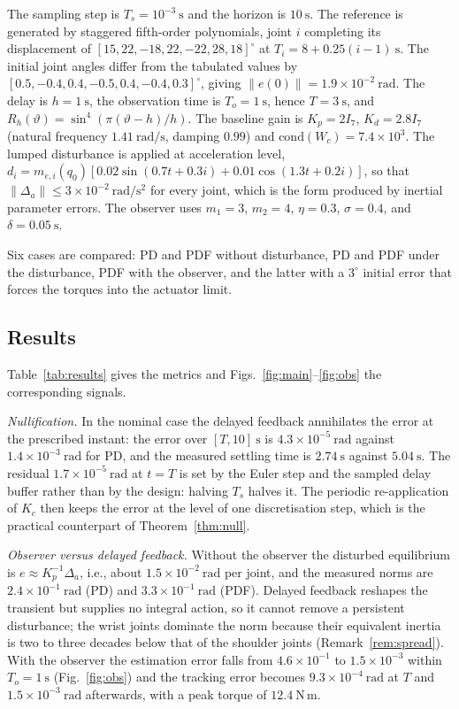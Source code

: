 The sampling step is $T_s=10^{-3}~\mathrm{s}$ and the horizon is $10~\mathrm{s}$.
The reference is generated by staggered fifth-order polynomials, joint $i$
completing its displacement of $[15,22,-18,22,-22,28,18]^\circ$ at
$T_i=8+0.25(i-1)~\mathrm{s}$. The initial joint angles differ from the tabulated
values by $[0.5,-0.4,0.4,-0.5,0.4,-0.4,0.3]^\circ$, giving
$\|e(0)\|=1.9\times10^{-2}~\mathrm{rad}$. The delay is $h=1~\mathrm{s}$, the
observation time is $T_o=1~\mathrm{s}$, hence $T=3~\mathrm{s}$, and
$R_h(\vartheta)=\sin^4(\pi(\vartheta-h)/h)$. The baseline gain is
$K_p=2I_7$, $K_d=2.8I_7$ (natural frequency $1.41~\mathrm{rad/s}$, damping
$0.99$) and $\mathrm{cond}(W_c)=7.4\times10^3$. The lumped disturbance is
applied at acceleration level,
$d_i=m_{e,i}(q_0)[0.02\sin(0.7t+0.3i)+0.01\cos(1.3t+0.2i)]$, so that
$\|\Delta_a\|\le3\times10^{-2}~\mathrm{rad/s^2}$ for every joint, which is the
form produced by inertial parameter errors. The observer uses $m_1=3$, $m_2=4$,
$\eta=0.3$, $\sigma=0.4$, and $\delta=0.05~\mathrm{s}$.

Six cases are compared: PD and PDF without disturbance, PD and PDF under the
disturbance, PDF with the observer, and the latter with a $3^\circ$ initial
error that forces the torques into the actuator limit.

\subsection{Results}
Table~\ref{tab:results} gives the metrics and Figs.~\ref{fig:main}--\ref{fig:obs}
the corresponding signals.

\emph{Nullification.} In the nominal case the delayed feedback annihilates the
error at the prescribed instant: the error over $[T,10]~\mathrm{s}$ is
$4.3\times10^{-5}~\mathrm{rad}$ against $1.4\times10^{-3}~\mathrm{rad}$ for PD,
and the measured settling time is $2.74~\mathrm{s}$ against $5.04~\mathrm{s}$.
The residual $1.7\times10^{-5}~\mathrm{rad}$ at $t=T$ is set by the Euler step
and the sampled delay buffer rather than by the design: halving $T_s$ halves
it. The periodic re-application of $K_c$ then keeps the error at the level of
one discretisation step, which is the practical counterpart of
Theorem~\ref{thm:null}.

\emph{Observer versus delayed feedback.} Without the observer the disturbed
equilibrium is $e\approx K_p^{-1}\Delta_a$, i.e., about
$1.5\times10^{-2}~\mathrm{rad}$ per joint, and the measured norms are
$2.4\times10^{-1}~\mathrm{rad}$ (PD) and $3.3\times10^{-1}~\mathrm{rad}$ (PDF).
Delayed feedback reshapes the transient but supplies no integral action, so it
cannot remove a persistent disturbance; the wrist joints dominate the norm
because their equivalent inertia is two to three decades below that of the
shoulder joints (Remark~\ref{rem:spread}). With the observer the estimation
error falls from $4.6\times10^{-1}$ to $1.5\times10^{-3}$ within
$T_o=1~\mathrm{s}$ (Fig.~\ref{fig:obs}) and the tracking error becomes
$9.3\times10^{-4}~\mathrm{rad}$ at $T$ and $1.5\times10^{-3}~\mathrm{rad}$
afterwards, with a peak torque of $12.4~\mathrm{N\,m}$.

